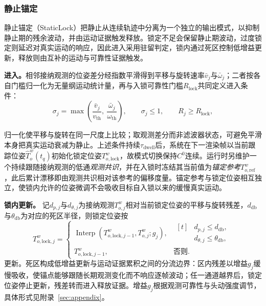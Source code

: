 \documentclass[review]{vgtc}
\begin{document}
\subsubsection{静止锚定}\label{sec:staticlock}

静止锚定（StaticLock）把静止从连续轨迹中分离为一个独立的输出模式，以抑制静止期的残余波动，并由运动证据触发释放。锁定不足会保留静止期波动，过度锁定则延迟对真实运动的响应，因此进入采用驻留判定，锁内通过死区控制低增益更新，释放则由互补的运动与可靠性证据触发。

\textbf{进入。}相邻接纳观测的位姿差分经指数平滑得到平移与旋转速率$\bar{v}_j$与$\bar{\omega}_j$；二者按各自门槛归一化为无量纲运动统计量，再与入锁可靠性门槛$R_{\mathrm{lock}}$共同定义进入条件：
\begin{equation}
\sigma_j = \max\left(\frac{\bar{v}_j}{v_{\mathrm{th}}},\ \frac{\bar{\omega}_j}{\omega_{\mathrm{th}}}\right), \qquad \sigma_j \leq 1, \qquad R_j \geq R_{\mathrm{lock}},
\label{eq:lock-entry}
\end{equation}

归一化使平移与旋转在同一尺度上比较；取观测差分而非滤波器状态，可避免平滑本身把真实运动衰减为静止。上述条件持续$\tau_{\mathrm{dwell}}$后，系统在下一渲染帧以当前跟踪位姿$\widehat{T}_o^w(t_q)$初始化锁定位姿$T_{o,\mathrm{lock}}^w$，故模式切换保持$C^0$连续。运行时另维护一个持续跟随接纳观测的低通\emph{观测共识}，并在入锁时冻结其当前值为\emph{锚定参考}$T_{o,\mathrm{ref}}^w$，此后累计漂移即由观测共识相对该参考的偏移度量。锚定参考与锁定位姿相互独立，使锁内允许的位姿微调不会吸收目标自入锁以来的缓慢真实运动。

\textbf{锁内更新。}
记$d_{p,j}$与$d_{\theta,j}$为接纳观测$T_{o,j}^{w}$相对当前锁定位姿的平移与旋转残差，$d_{\mathrm{db}}$与$\theta_{\mathrm{db}}$为对应的死区半径，则锁定位姿按
\begin{equation}
T_{o,\mathrm{lock},j}^w =
\begin{cases}
\operatorname{Interp}
\left(
T_{o,\mathrm{lock},j-1}^w,
T_{o,j}^{w};
g_j
\right),
&
\begin{aligned}[t]
&d_{p,j} \leq d_{\mathrm{db}},\\
&d_{\theta,j} \leq \theta_{\mathrm{db}},
\end{aligned}
\\[2pt]
T_{o,\mathrm{lock},j-1}^w,
&
\text{否则}.
\end{cases}
\label{eq:lock-update}
\end{equation}
更新。死区构成低增益更新与运动证据累积之间的分流边界：区内残差以增益$g_j$缓慢吸收，使锚点能够跟随长期观测变化而不响应逐帧波动；任一通道越界后，锁定位姿停止更新，残差转而进入释放证据。增益$g_j$根据观测可靠性与头动强度调节，具体形式见附录~\ref{sec:appendix}。
\end{document}
